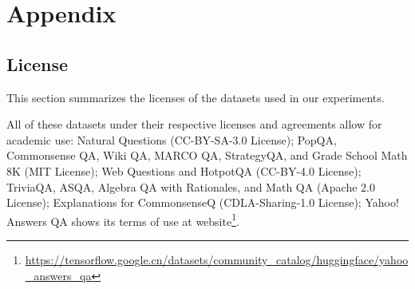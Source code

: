

\section{Appendix}



\subsection{License} \label{license}
This section summarizes the licenses of the datasets used in our experiments.

All of these datasets under their respective licenses and agreements allow for academic use: Natural Questions (CC-BY-SA-3.0 License); PopQA, Commonsense QA, Wiki QA, MARCO QA, StrategyQA, and Grade School Math 8K (MIT License); Web Questions and HotpotQA (CC-BY-4.0 License); TriviaQA, ASQA, Algebra QA with Rationales, and Math QA (Apache 2.0 License); Explanations for CommonsenseQ (CDLA-Sharing-1.0 License); Yahoo! Answers QA shows its terms of use at website\footnote{\url{https://tensorflow.google.cn/datasets/community_catalog/huggingface/yahoo_answers_qa}}. 





